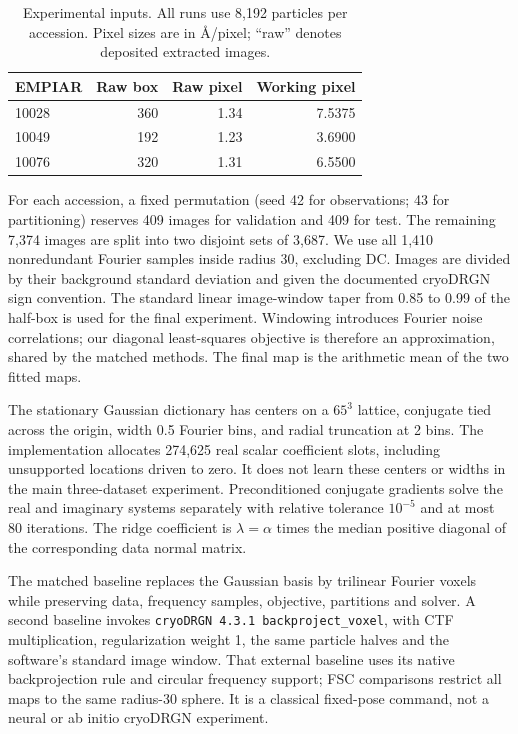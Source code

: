 \begin{table}[t]
\caption{Experimental inputs. All runs use 8,192 particles per accession. Pixel
sizes are in \AA/pixel; ``raw'' denotes deposited extracted images.}
\label{tab:data}
\centering\small
\begin{tabular}{lrrr}\toprule
EMPIAR & Raw box & Raw pixel & Working pixel\\\midrule
10028 & 360 & 1.34 & 7.5375 \\
10049 & 192 & 1.23 & 3.6900 \\
10076 & 320 & 1.31 & 6.5500 \\
\bottomrule\end{tabular}\end{table}
For each accession, a fixed permutation (seed 42 for observations; 43 for
partitioning) reserves 409 images for validation and 409 for test. The remaining
7,374 images are split into two disjoint sets of 3,687. We use all 1,410 nonredundant
Fourier samples inside radius 30, excluding DC. Images are divided by their
background standard deviation and given the documented cryoDRGN sign convention.
The standard linear image-window taper from 0.85 to 0.99 of the half-box is used
for the final experiment. Windowing introduces Fourier noise correlations; our
diagonal least-squares objective is therefore an approximation, shared by the
matched methods. The final map is the arithmetic mean of the two fitted maps.

The stationary Gaussian dictionary has centers on a $65^3$ lattice, conjugate
tied across the origin, width 0.5 Fourier bins, and radial truncation at 2 bins.
The implementation allocates 274,625 real scalar coefficient slots, including
unsupported locations driven to zero. It does not learn these centers or widths
in the main three-dataset experiment. Preconditioned conjugate gradients solve
the real and imaginary systems separately with relative tolerance $10^{-5}$ and
at most 80 iterations. The ridge coefficient is $\lambda=\alpha$
times the median positive diagonal of the corresponding data normal matrix.

The matched baseline replaces the Gaussian basis by trilinear Fourier voxels
while preserving data, frequency samples, objective, partitions and solver.
A second baseline invokes \texttt{cryoDRGN 4.3.1 backproject\_voxel}, with
CTF multiplication, regularization weight 1, the same particle halves and the
software's standard image window. That external baseline uses its native
backprojection rule and circular frequency support; FSC comparisons restrict all
maps to the same radius-30 sphere. It is a classical fixed-pose command, not a
neural or ab initio cryoDRGN experiment.

